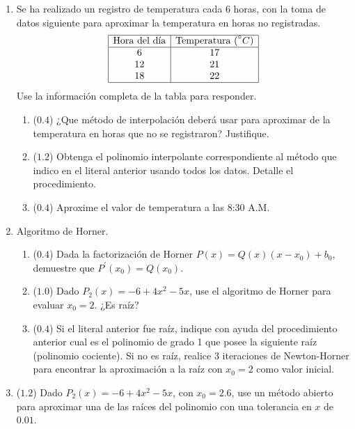 \documentclass[12pt]{article}
\begin{document}
\vspace{-.5cm}
  \begin{enumerate}[leftmargin=*,widest=9]
     \item Se ha realizado un registro de temperatura cada 6 horas, con la toma de datos siguiente para aproximar la temperatura en horas no registradas.
     \begin{equation*}
     \begin{array}{|c|c|}
     \hline
     \text{Hora del día} & \text{Temperatura (} ^{\circ}C \text{)}\\
     \hline
     6 & 17\\
     12 & 21\\
     18 & 22\\
     \hline
     \end{array}
     \end{equation*}
     Use la información completa de la tabla para responder.
     \begin{enumerate}[label=\alph*]
     \item (\(0.4\)) ¿Que método de interpolación deberá usar para aproximar de la temperatura en horas que no se registraron? Justifique.
     \vspace{4cm}
     \item (\(1.2\)) Obtenga el polinomio interpolante correspondiente al método que indico en el literal anterior usando todos los datos. Detalle el procedimiento.
     \vspace*{10cm}
     \item (\(0.4\)) Aproxime el valor de temperatura a las 8:30 A.M.
     \vspace{2cm}
     \end{enumerate}
    \item Algoritmo de Horner.
    \begin{enumerate}[label=\alph*]
    \item (\(0.4\)) Dada la factorización de Horner \( P(x) = Q(x)(x-x_0) + b_0\), demuestre que \(P^{\prime}(x_0) = Q(x_0)\).
    \vspace{4cm}
    \item (\(1.0\)) Dado \(P_2(x) = -6 + 4x^2 - 5x\), use el algoritmo de Horner para evaluar \(x_0 = 2\). ¿Es raíz?
    \vspace{4cm}
    \item (\(0.4\)) Si el literal anterior fue raíz, indique con ayuda del procedimiento anterior cual es el polinomio de grado 1 que posee la siguiente raíz (polinomio cociente). Si no es raíz, realice 3 iteraciones de Newton-Horner para encontrar la aproximación a la raíz con \(x_0 = 2\) como valor inicial.
    \vspace{2cm}
   \end{enumerate}
   \item (\(1.2\)) Dado \(P_2(x) = -6 + 4x^2 - 5x\), con \(x_0 = 2.6\), use un método abierto para aproximar una de las raíces del polinomio con una tolerancia en \(x\) de \(0.01\).
  \vspace{10cm}
  \end{enumerate}
\end{document}
